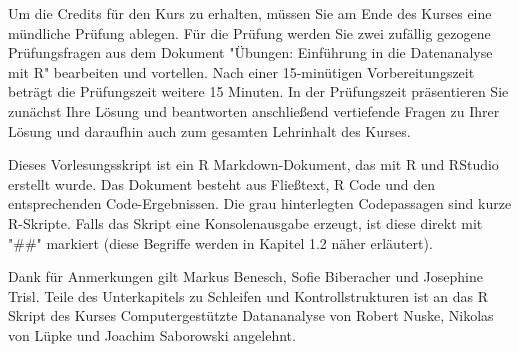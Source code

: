 \begin{titlepage}
Um die Credits für den Kurs zu erhalten, müssen Sie am Ende des Kurses eine mündliche Prüfung ablegen. Für die Prüfung werden Sie zwei zufällig gezogene Prüfungsfragen aus dem Dokument "Übungen: Einführung in die Datenanalyse mit R" bearbeiten und vortellen.  Nach einer 15-minütigen Vorbereitungszeit beträgt die Prüfungszeit weitere 15 Minuten. In der Prüfungszeit präsentieren Sie zunächst Ihre Lösung und beantworten anschließend vertiefende Fragen zu Ihrer Lösung und daraufhin auch zum gesamten Lehrinhalt des Kurses.

Dieses Vorlesungsskript ist ein R Markdown-Dokument, das mit R und RStudio erstellt wurde. Das Dokument besteht aus Fließtext, R Code und den entsprechenden Code-Ergebnissen. Die grau hinterlegten Codepassagen sind kurze R-Skripte. Falls das Skript eine Konsolenausgabe erzeugt, ist diese direkt mit "\#\#" markiert (diese Begriffe werden in Kapitel 1.2 näher erläutert).

Dank für Anmerkungen gilt Markus Benesch, Sofie Biberacher und Josephine Trisl.
Teile des Unterkapitels zu Schleifen und Kontrollstrukturen ist an das R Skript des Kurses Computergestützte Datananalyse von Robert Nuske, Nikolas von Lüpke und Joachim Saborowski angelehnt.
\end{titlepage}

